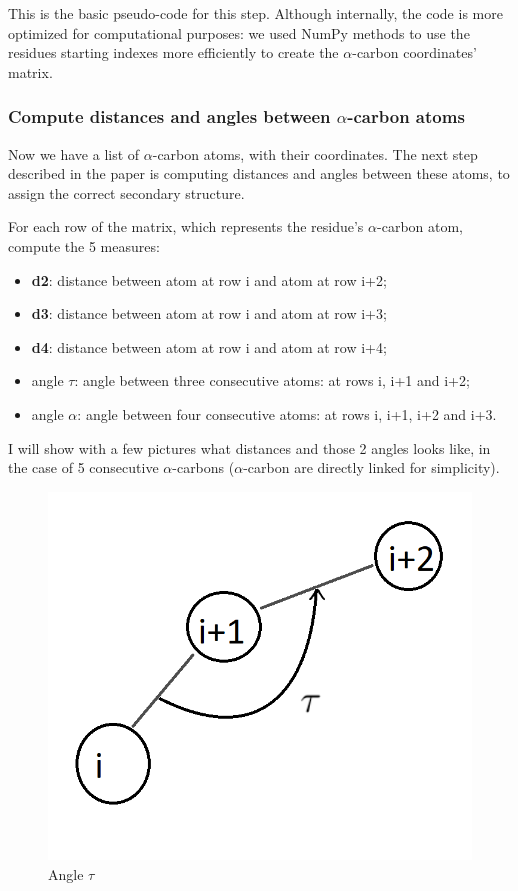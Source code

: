 This is the basic pseudo-code for this step. Although internally, the code is more optimized for computational purposes: we used NumPy methods to use the residues starting indexes more efficiently to create the $\alpha$-carbon coordinates' matrix.

\pagebreak

\subsubsection{Compute distances and angles between $\alpha$-carbon atoms}
Now we have a list of $\alpha$-carbon atoms, with their coordinates. The next step described in the paper is computing distances and angles between these atoms, to assign the correct secondary structure.

For each row of the matrix, which represents the residue's $\alpha$-carbon atom, compute the 5 measures:
\begin{itemize}
    \item \textbf{d2}: distance between atom at row i and atom at row i+2;
    \item \textbf{d3}: distance between atom at row i and atom at row i+3;
    \item \textbf{d4}: distance between atom at row i and atom at row i+4;
    \item angle $\tau$: angle between three consecutive atoms: at rows i, i+1 and i+2;
    \item angle $\alpha$: angle between four consecutive atoms: at rows i, i+1, i+2 and i+3.
\end{itemize}

I will show with a few pictures what distances and those 2 angles looks like, in the case of 5 consecutive $\alpha$-carbons ($\alpha$-carbon are directly linked for simplicity).

\pagebreak

\begin{figure}[h!]
    \centering
    \includegraphics[scale=0.4]{res/dev/angleTau.png}
    \caption{Angle $\tau$}
\end{figure}

